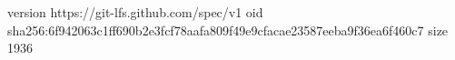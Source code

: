 version https://git-lfs.github.com/spec/v1
oid sha256:6f942063c1ff690b2e3fcf78aafa809f49e9cfacae23587eeba9f36ea6f460c7
size 1936
